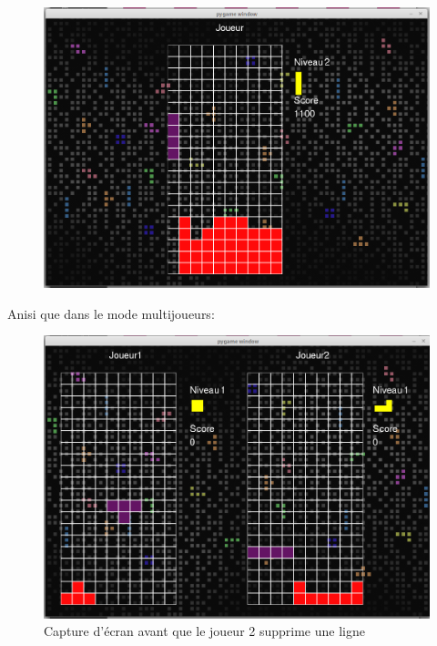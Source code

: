 \documentclass[a4paper, 11pt]{article}
\begin{document}
            \begin{figure}[ht]
                \centering
                \includegraphics[scale=0.25]{images/jeu4.png}
            \end{figure}
            \newpage
            Anisi que dans le mode multijoueurs:
            
            \begin{figure}[ht]
                \centering
                \includegraphics[scale=0.25]{images/jeuM1.png}
                \caption{Capture d'écran avant que le joueur 2 supprime une ligne}
            \end{figure}
            
\end{document}
